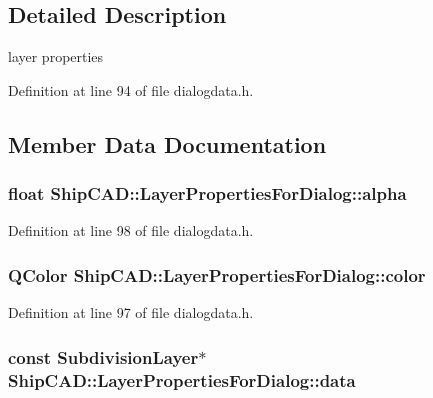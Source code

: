 \subsection{Detailed Description}
layer properties 

Definition at line 94 of file dialogdata.\+h.



\subsection{Member Data Documentation}
\subsubsection[{\texorpdfstring{alpha}{alpha}}]{\setlength{\rightskip}{0pt plus 5cm}float Ship\+C\+A\+D\+::\+Layer\+Properties\+For\+Dialog\+::alpha}\hypertarget{structShipCAD_1_1LayerPropertiesForDialog_a8ecd6d4c933122d9f3c8f3c8fcf54781}{}\label{structShipCAD_1_1LayerPropertiesForDialog_a8ecd6d4c933122d9f3c8f3c8fcf54781}


Definition at line 98 of file dialogdata.\+h.

\subsubsection[{\texorpdfstring{color}{color}}]{\setlength{\rightskip}{0pt plus 5cm}Q\+Color Ship\+C\+A\+D\+::\+Layer\+Properties\+For\+Dialog\+::color}\hypertarget{structShipCAD_1_1LayerPropertiesForDialog_a20a555fd2c477f691cc04a4fe9b7f6b0}{}\label{structShipCAD_1_1LayerPropertiesForDialog_a20a555fd2c477f691cc04a4fe9b7f6b0}


Definition at line 97 of file dialogdata.\+h.

\subsubsection[{\texorpdfstring{data}{data}}]{\setlength{\rightskip}{0pt plus 5cm}const {\bf Subdivision\+Layer}$\ast$ Ship\+C\+A\+D\+::\+Layer\+Properties\+For\+Dialog\+::data}\hypertarget{structShipCAD_1_1LayerPropertiesForDialog_a0bcd4eb69a1b82c26e9dfcf1707cf850}{}\label{structShipCAD_1_1LayerPropertiesForDialog_a0bcd4eb69a1b82c26e9dfcf1707cf850}


